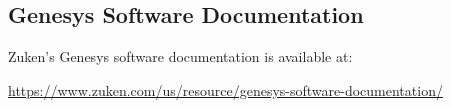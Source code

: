 
\newpage
\begin{appendices}

\chapter{Genesys Software Documentation}
\label{app:genesys-docs}

Zuken's Genesys software documentation is available at:

\begin{center}
  \url{https://www.zuken.com/us/resource/genesys-software-documentation/}
\end{center}

\end{appendices}